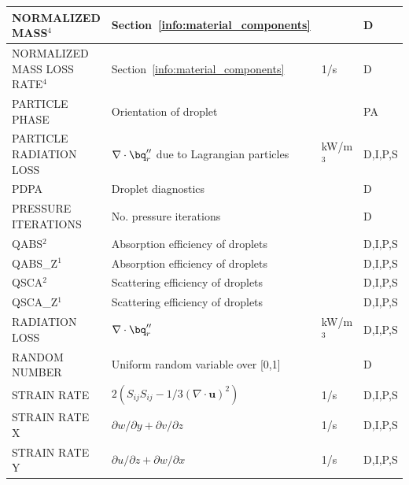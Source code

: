 \documentclass[11pt]{book}
\begin{document}
\begin{longtable}{@{\extracolsep{\fill}}|l|l|l|l|}
{\ct NORMALIZED MASS}$^4$                       & Section~\ref{info:material_components}            &                & D            \\ \hline
{\ct NORMALIZED MASS LOSS RATE}$^4$             & Section~\ref{info:material_components}            & 1/s            & D            \\ \hline
{\ct PARTICLE PHASE}                            & Orientation of droplet                            &                & PA           \\ \hline
{\ct PARTICLE RADIATION LOSS}                   & $\nabla \cdot \bq_r''$ due to Lagrangian particles& kW/m$^3$       & D,I,P,S      \\ \hline
{\ct PDPA}                                      & Droplet diagnostics                               &                & D            \\ \hline
{\ct PRESSURE ITERATIONS}                       & No. pressure iterations                           &                & D            \\ \hline
{\ct QABS}$^2$                                  & Absorption efficiency of droplets                 &                & D,I,P,S      \\ \hline
{\ct QABS\_Z}$^1$                               & Absorption efficiency of droplets                 &                & D,I,P,S      \\ \hline
{\ct QSCA}$^2$                                  & Scattering efficiency of droplets                 &                & D,I,P,S      \\ \hline
{\ct QSCA\_Z}$^1$                               & Scattering efficiency of droplets                 &                & D,I,P,S      \\ \hline
{\ct RADIATION LOSS}                            & $\nabla \cdot \bq_r''$                            & kW/m$^3$       & D,I,P,S      \\ \hline
{\ct RANDOM NUMBER}                             & Uniform random variable over [0,1]                &                & D            \\ \hline
{\ct STRAIN RATE}                               & $2(S_{ij}S_{ij}-1/3(\nabla\cdot\mathbf{u})^2)$    & 1/s            & D,I,P,S      \\ \hline
{\ct STRAIN RATE X}                             & $\partial w/\partial y + \partial v/\partial z$   & 1/s            & D,I,P,S      \\ \hline
{\ct STRAIN RATE Y}                             & $\partial u/\partial z + \partial w/\partial x$   & 1/s            & D,I,P,S      \\ \hline

\end{longtable}
\end{document}
